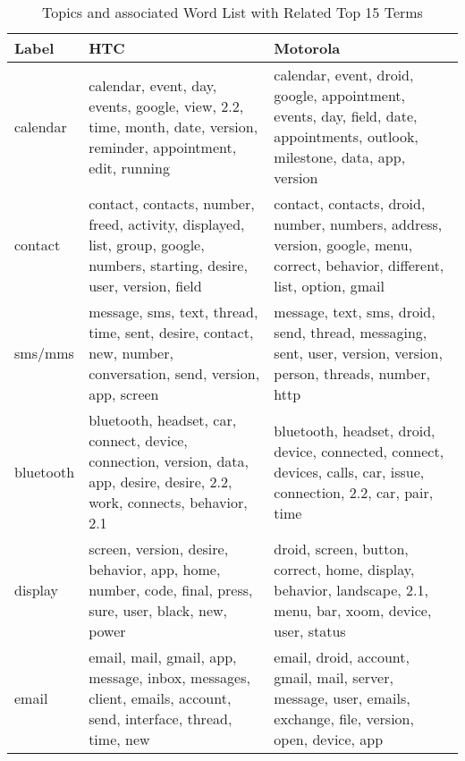 \begin{table*}[!htb]
\caption{Topics and associated Word List with Related Top 15 Terms}
\label{topicslist}
\centering
\begin{tabular}{|m{1.75cm}<{\centering}||m{7.33cm}<{\centering}||m{7.33cm}<{\centering}|}
\hline
Label & HTC & Motorola\\ 
\hline

calendar 
&
calendar,  event,  day,  events,  google,  
view,  2.2,  time,  month,  date,  
version,  reminder,  appointment,  edit,  running 
&
calendar,  event,  droid,  google,  appointment, 
events,  day,  field,  date,  appointments, 
 outlook,  milestone,  data,  app,  version
\\ \hline

contact
&
contact,  contacts,  number,  freed,  activity,  
displayed,  list,  group,  google,  numbers,  
starting,  desire,  user,  version,  field 
&
contact,  contacts,  droid,  number,  numbers, 
address,  version,  google,  menu,  correct, 
behavior,  different, list,  option,  gmail
\\ \hline

 sms\//mms &
message,  sms,  text,  thread,  time,  
sent,  desire,  contact,  new,  number,  
conversation,  send,  version,  app,  screen 
&
message,  text,  sms,  droid,  send, 
thread,  messaging,  sent,  user,  version, 
version,  person,  threads,  number,  http
\\ \hline

bluetooth
&
bluetooth, headset,  car,  connect,  device,  
connection,  version,  data,  app,  desire,  
desire,  2.2,  work,  connects,  behavior,  2.1 
&
bluetooth,  headset,  droid,  device, connected, 
connect,  devices,  calls,  car, issue, 
connection,  2.2,  car,  pair,  time
\\ \hline

display
&
screen,  version,  desire,  behavior,  app,  
home,  number,  code,  final,  press,  
  sure,  user,  black,  new,  power 
&
droid,  screen,  button,  correct,  home, 
display,  behavior,  landscape,  2.1,  menu, 
bar,  xoom, device,  user,  status
\\ \hline

email &
email,  mail,  gmail,  app,  message,  
inbox,  messages,  client,  emails,  account,  
send,  interface,  thread,  time,  new 
&
email,  droid,  account,  gmail,  mail, 
server,  message,  user,  emails,  exchange, 
file,  version,  open,  device,  app
\\ \hline


\end{tabular}
\end{table*}
